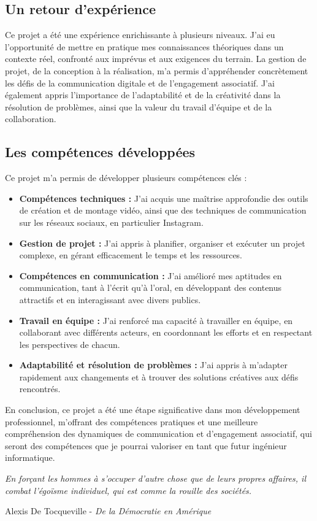 
\subsection{Un retour d'expérience}\label{subsec:un-retour-d'experience}

Ce projet a été une expérience enrichissante à plusieurs niveaux.
J'ai eu l'opportunité de mettre en pratique mes connaissances théoriques dans un contexte réel, confronté aux imprévus et aux exigences du terrain.
La gestion de projet, de la conception à la réalisation, m'a permis d'appréhender concrètement les défis de la communication digitale et de l'engagement associatif.
J'ai également appris l'importance de l'adaptabilité et de la créativité dans la résolution de problèmes, ainsi que la valeur du travail d'équipe et de la collaboration.

\subsection{Les compétences développées}\label{subsec:les-competences-developpees}

Ce projet m'a permis de développer plusieurs compétences clés :
\begin{itemize}
    \item \textbf{Compétences techniques :} J'ai acquis une maîtrise approfondie des outils de création et de montage vidéo, ainsi que des techniques de communication sur les réseaux sociaux, en particulier Instagram.
    \item \textbf{Gestion de projet :} J'ai appris à planifier, organiser et exécuter un projet complexe, en gérant efficacement le temps et les ressources.
    \item \textbf{Compétences en communication :} J'ai amélioré mes aptitudes en communication, tant à l'écrit qu'à l'oral, en développant des contenus attractifs et en interagissant avec divers publics.
    \item \textbf{Travail en équipe :} J'ai renforcé ma capacité à travailler en équipe, en collaborant avec différents acteurs, en coordonnant les efforts et en respectant les perspectives de chacun.
    \item \textbf{Adaptabilité et résolution de problèmes :} J'ai appris à m'adapter rapidement aux changements et à trouver des solutions créatives aux défis rencontrés.
\end{itemize}


En conclusion, ce projet a été une étape significative dans mon développement professionnel, m'offrant des compétences pratiques et une meilleure compréhension des dynamiques de communication et d'engagement associatif, qui seront des compétences que je pourrai valoriser en tant que futur ingénieur informatique.


\begin{center}
    \textit{\og En forçant les hommes à s'occuper d'autre chose que de leurs propres affaires, il combat l'égoïsme individuel, qui est comme la rouille des sociétés. \fg{}}

    Alexis De Tocqueville - \textit{De la Démocratie en Amérique}\cite{De_la_Democratie_en_Amerique}
\end{center}
